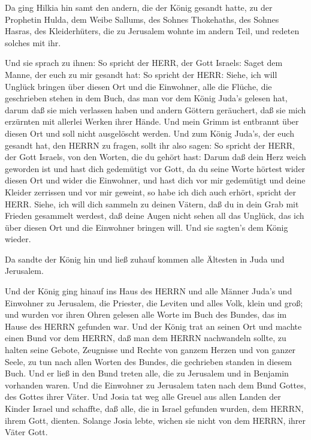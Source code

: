  Da ging Hilkia hin samt den andern, die der König gesandt
hatte, zu der Prophetin Hulda, dem Weibe Sallums, des Sohnes Thokehaths,
des Sohnes Hasras, des Kleiderhüters, die zu Jerusalem wohnte im andern
Teil, und redeten solches mit ihr.

 Und sie sprach zu ihnen: So spricht der HERR, der Gott
Israels: Saget dem Manne, der euch zu mir gesandt hat:  So
spricht der HERR: Siehe, ich will Unglück bringen über diesen Ort und
die Einwohner, alle die Flüche, die geschrieben stehen in dem Buch, das
man vor dem König Juda's gelesen hat,  darum daß sie mich
verlassen haben und andern Göttern geräuchert, daß sie mich erzürnten
mit allerlei Werken ihrer Hände. Und mein Grimm ist entbrannt über
diesen Ort und soll nicht ausgelöscht werden.  Und zum
König Juda's, der euch gesandt hat, den HERRN zu fragen, sollt ihr also
sagen: So spricht der HERR, der Gott Israels, von den Worten, die du
gehört hast:  Darum daß dein Herz weich geworden ist und
hast dich gedemütigt vor Gott, da du seine Worte hörtest wider diesen
Ort und wider die Einwohner, und hast dich vor mir gedemütigt und deine
Kleider zerrissen und vor mir geweint, so habe ich dich auch erhört,
spricht der HERR.  Siehe, ich will dich sammeln zu deinen
Vätern, daß du in dein Grab mit Frieden gesammelt werdest, daß deine
Augen nicht sehen all das Unglück, das ich über diesen Ort und die
Einwohner bringen will. Und sie sagten's dem König wieder.

 Da sandte der König hin und ließ zuhauf kommen alle
Ältesten in Juda und Jerusalem.

 Und der König ging hinauf ins Haus des HERRN und alle
Männer Juda's und Einwohner zu Jerusalem, die Priester, die Leviten und
alles Volk, klein und groß; und wurden vor ihren Ohren gelesen alle
Worte im Buch des Bundes, das im Hause des HERRN gefunden war.
 Und der König trat an seinen Ort und machte einen Bund vor
dem HERRN, daß man dem HERRN nachwandeln sollte, zu halten seine Gebote,
Zeugnisse und Rechte von ganzem Herzen und von ganzer Seele, zu tun nach
allen Worten des Bundes, die gechrieben standen in diesem Buch.
 Und er ließ in den Bund treten alle, die zu Jerusalem und
in Benjamin vorhanden waren. Und die Einwohner zu Jerusalem taten nach
dem Bund Gottes, des Gottes ihrer Väter.  Und Josia tat weg
alle Greuel aus allen Landen der Kinder Israel und schaffte, daß alle,
die in Israel gefunden wurden, dem HERRN, ihrem Gott, dienten. Solange
Josia lebte, wichen sie nicht von dem HERRN, ihrer Väter Gott.

